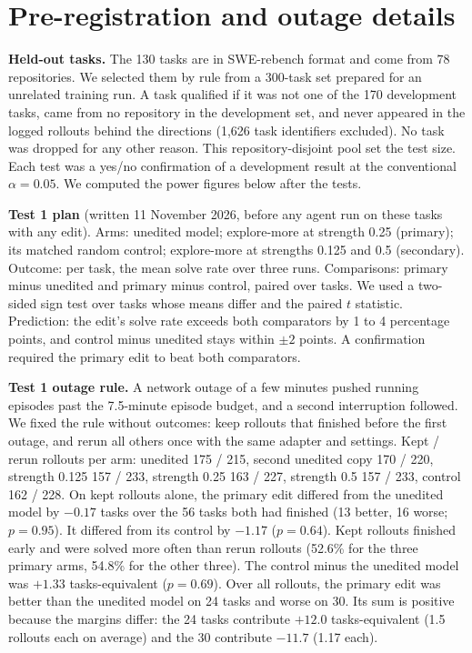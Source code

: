 \section{Pre-registration and outage details}
\label{app:prereg}
\textbf{Held-out tasks.} The 130 tasks are in SWE-rebench format and come from 78 repositories. We selected them by rule from a 300-task set prepared for an unrelated training run. A task qualified if it was not one of the 170 development tasks, came from no repository in the development set, and never appeared in the logged rollouts behind the directions (1,626 task identifiers excluded). No task was dropped for any other reason. This repository-disjoint pool set the test size. Each test was a yes/no confirmation of a development result at the conventional $\alpha = 0.05$. We computed the power figures below after the tests.

\textbf{Test 1 plan} (written 11 November 2026, before any agent run on these tasks with any edit). Arms: unedited model; explore-more at strength 0.25 (primary); its matched random control; explore-more at strengths 0.125 and 0.5 (secondary). Outcome: per task, the mean solve rate over three runs. Comparisons: primary minus unedited and primary minus control, paired over tasks. We used a two-sided sign test over tasks whose means differ and the paired $t$ statistic. Prediction: the edit's solve rate exceeds both comparators by 1 to 4 percentage points, and control minus unedited stays within $\pm 2$ points. A confirmation required the primary edit to beat both comparators.

\textbf{Test 1 outage rule.} A network outage of a few minutes pushed running episodes past the 7.5-minute episode budget, and a second interruption followed. We fixed the rule without outcomes: keep rollouts that finished before the first outage, and rerun all others once with the same adapter and settings. Kept / rerun rollouts per arm: unedited 175 / 215, second unedited copy 170 / 220, strength 0.125 157 / 233, strength 0.25 163 / 227, strength 0.5 157 / 233, control 162 / 228. On kept rollouts alone, the primary edit differed from the unedited model by $-0.17$ tasks over the 56 tasks both had finished (13 better, 16 worse; $p = 0.95$). It differed from its control by $-1.17$ ($p = 0.64$). Kept rollouts finished early and were solved more often than rerun rollouts (52.6\% for the three primary arms, 54.8\% for the other three). The control minus the unedited model was $+1.33$ tasks-equivalent ($p = 0.69$). Over all rollouts, the primary edit was better than the unedited model on 24 tasks and worse on 30. Its sum is positive because the margins differ: the 24 tasks contribute $+12.0$ tasks-equivalent (1.5 rollouts each on average) and the 30 contribute $-11.7$ (1.17 each).

